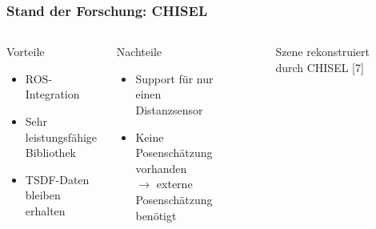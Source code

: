 \begin{frame}[t]
  \frametitle{Stand der Forschung: CHISEL}
  
  \begin{columns}[t]
      \column[]{6cm}
      
  \begin{exampleblock}{Vorteile}
  \begin{itemize}
    \item ROS-Integration
    \item Sehr leistungsfähige Bibliothek
    \item TSDF-Daten bleiben erhalten
  \end{itemize} 
  \end{exampleblock}
  
  \begin{alertblock}{Nachteile}
    \begin{itemize}
      \item Support für nur einen Distanzsensor
      \item Keine Posenschätzung vorhanden \\ $\rightarrow$ externe Posenschätzung benötigt
    \end{itemize} 
  \end{alertblock}
     
     \column{6cm}
      
      \begin{figure}[h]
 	\caption{Szene rekonstruiert durch CHISEL [7]} 
      \end{figure}
  
    \end{columns}
\end{frame}

